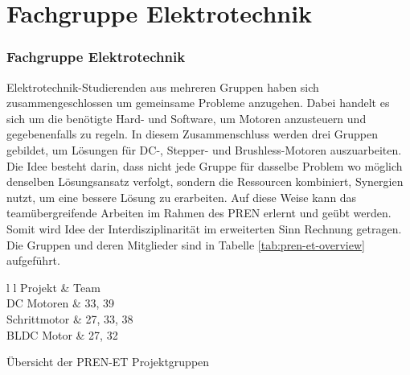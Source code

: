 \ifSTANDALONE
\section{Fachgruppe Elektrotechnik}
\fi
\ifEMBED
\subsubsection{Fachgruppe Elektrotechnik}
\label{chap:Fachgruppe Elektrotechnik}
\fi
Elektrotechnik-Studierenden aus mehreren Gruppen haben sich
zusammengeschlossen um gemeinsame Probleme anzugehen. Dabei handelt es sich
um die benötigte Hard- und Software, um Motoren anzusteuern
und gegebenenfalls zu regeln. In diesem Zusammenschluss werden drei Gruppen
gebildet, um Lösungen für DC-, Stepper- und Brushless-Motoren auszuarbeiten.
Die Idee besteht darin, dass nicht jede Gruppe für dasselbe Problem wo
möglich denselben Lösungsansatz verfolgt, sondern die Ressourcen kombiniert,
Synergien nutzt, um eine bessere Lösung zu erarbeiten. Auf diese Weise kann
das teamübergreifende Arbeiten im Rahmen des PREN erlernt und
geübt werden. Somit wird Idee der Interdisziplinarität im erweiterten Sinn
Rechnung getragen. Die Gruppen und deren Mitglieder sind in Tabelle 
\ref{tab:pren-et-overview} aufgeführt.
\begin{table}[h!]
	\centering
	\begin{zebratabular}{l l}
		 Projekt		& Team \\
		DC Motoren   & 33, 39 \\
		Schrittmotor & 27, 33, 38 \\
		BLDC Motor   & 27, 32 \\
	\end{zebratabular}
	\caption{Übersicht der PREN-ET Projektgruppen}
	\label{tab:pren-et-overview}
\end{table}
